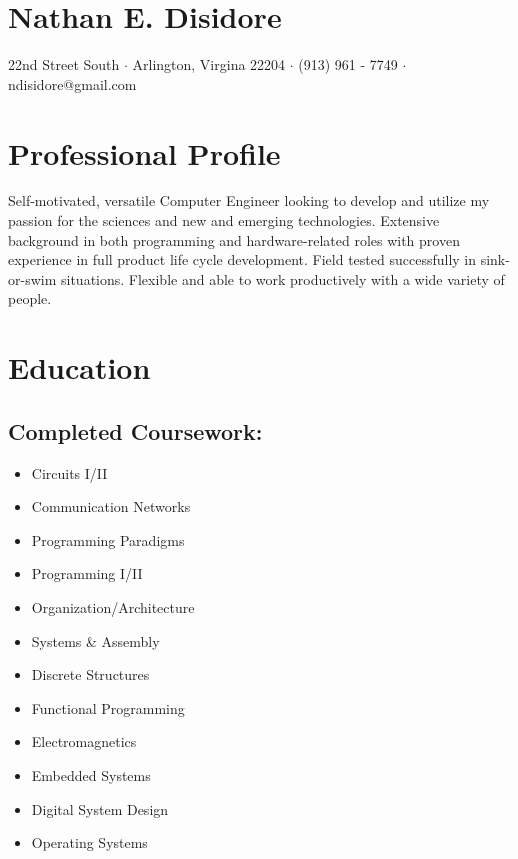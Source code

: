 \documentclass[10pt]{article}
\newcommand{\startsquarepar}{\par\begingroup \parfillskip 0pt \relax}
\newcommand{\stopsquarepar}{\par\endgroup}
\newenvironment{ninept}{\fontsize{9}{12}\selectfont}{\par}
\begin{document}
\pagestyle{empty} %

\section*{\Huge Nathan E. Disidore}
\startsquarepar
  3429 22nd Street South $\cdot$ Arlington, Virgina 22204 $\cdot$ (913) 961 - 7749 $\cdot$ ndisidore@gmail.com
\stopsquarepar

\section*{Professional Profile}
Self-motivated, versatile Computer Engineer looking to develop and utilize my passion for the sciences and new and emerging technologies. Extensive background in both programming and hardware-related roles with proven experience in full product life cycle development. Field tested successfully in sink-or-swim situations. Flexible and able to work productively with a wide variety of people.

\section*{Education}
\subsection*{Completed Coursework:}
\begin{ninept}
  \begin{multicols}{4}
    \begin{itemize}
      \item Circuits I/II
      \item Communication Networks
      \item Programming Paradigms
      \item Programming I/II
      \item Organization/Architecture
      \item Systems \& Assembly
      \item Discrete Structures
      \item Functional Programming
      \item Electromagnetics
      \item Embedded Systems
      \item Digital System Design
      \item Operating Systems
    \end{itemize}
  \end{multicols}
\end{ninept}
\end{document}
